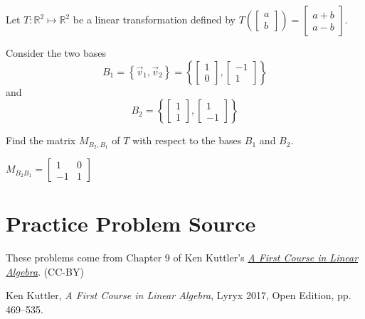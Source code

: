 \documentclass{ximera}
\begin{document}
\begin{problem}\label{prb:10.106}
Let $T: \mathbb{R}^2 \mapsto \mathbb{R}^2$ be a linear transformation defined by $T \left( \left[ \begin{array}{r}
a \\
b
\end{array} \right] \right) = \left[ \begin{array}{r}
a+b \\
a-b
\end{array} \right]$.

Consider the two bases
\[
B_1 = \left\{ \vec{v}_{1}, \vec{v}_{2} \right\} = \left\{ \left[ \begin{array}{r}
1 \\
0
\end{array}\right], \left[ \begin{array}{r}
-1 \\
1
\end{array}
\right]
\right\}
\]
 and
\[
B_2 = \left\{ \left[ \begin{array}{r}
1 \\
1
\end{array}
\right], \left[ \begin{array}{r}
1 \\
-1
\end{array}
\right]
\right\}
\]

Find the matrix $M_{B_2,B_1}$ of $T$ with respect to the bases $B_1$ and $B_2$.
\begin{hint}
$
M_{B_{2} B_{1}} = \left[
\begin{array}{rr}
 1 & 0 \\
 -1 & 1
\end{array}
\right] $
\end{hint}
\end{problem}




\section*{Practice Problem Source}
These problems come from Chapter 9 of Ken Kuttler's \href{https://open.umn.edu/opentextbooks/textbooks/a-first-course-in-linear-algebra-2017}{\it A First Course in Linear Algebra}. (CC-BY)

Ken Kuttler, {\it  A First Course in Linear Algebra}, Lyryx 2017, Open Edition, pp. 469--535.  
\end{document}
